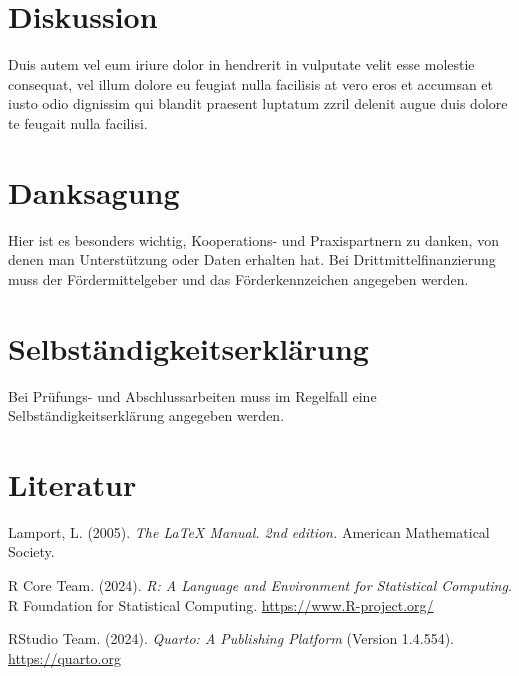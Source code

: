 \documentclass[
  11pt,
  a4paper,
]{tudscrreprt}
\newlength{\cslhangindent}
\newenvironment{CSLReferences}[2] %
 {\begin{list}{}{%
  \setlength{\itemindent}{0pt}
  \setlength{\leftmargin}{0pt}
  \setlength{\parsep}{0pt}
  \ifodd #1
   \setlength{\leftmargin}{\cslhangindent}
   \setlength{\itemindent}{-1\cslhangindent}
  \fi
  \setlength{\itemsep}{#2\baselineskip}}}
 {\end{list}}
\begin{document}
\chapter{Diskussion}\label{diskussion}

Duis autem vel eum iriure dolor in hendrerit in vulputate velit esse
molestie consequat, vel illum dolore eu feugiat nulla facilisis at vero
eros et accumsan et iusto odio dignissim qui blandit praesent luptatum
zzril delenit augue duis dolore te feugait nulla facilisi.

\chapter*{Danksagung}\label{danksagung}

Hier ist es besonders wichtig, Kooperations- und Praxispartnern zu
danken, von denen man Unterstützung oder Daten erhalten hat. Bei
Drittmittelfinanzierung muss der Fördermittelgeber und das
Förderkennzeichen angegeben werden.

\chapter*{Selbständigkeitserklärung}\label{selbstuxe4ndigkeitserkluxe4rung}

Bei Prüfungs- und Abschlussarbeiten muss im Regelfall eine
Selbständigkeitserklärung angegeben werden.

\chapter*{Literatur}\label{literatur}

\label{refs}
\begin{CSLReferences}{1}{0}
Lamport, L. (2005). \emph{The LaTeX Manual. 2nd edition.} {American
Mathematical Society}.

R Core Team. (2024). \emph{R: A Language and Environment for Statistical
Computing}. R Foundation for Statistical Computing.
\url{https://www.R-project.org/}

RStudio Team. (2024). \emph{Quarto: A Publishing Platform} (Version
1.4.554). \url{https://quarto.org}

\end{CSLReferences}
\end{document}
